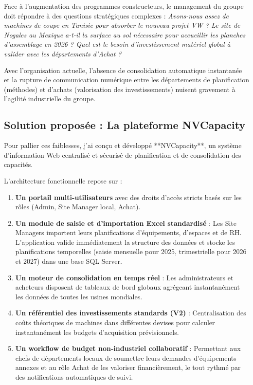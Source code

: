 Face à l'augmentation des programmes constructeurs, le management du groupe doit répondre à des questions stratégiques complexes : \textit{Avons-nous assez de machines de coupe en Tunisie pour absorber le nouveau projet VW ? Le site de Nogales au Mexique a-t-il la surface au sol nécessaire pour accueillir les planches d'assemblage en 2026 ? Quel est le besoin d'investissement matériel global à valider avec les départements d'Achat ?}

Avec l'organisation actuelle, l'absence de consolidation automatique instantanée et la rupture de communication numérique entre les départements de planification (méthodes) et d'achats (valorisation des investissements) nuisent gravement à l'agilité industrielle du groupe.

\subsection{Solution proposée : La plateforme NVCapacity}

Pour pallier ces faiblesses, j'ai conçu et développé **NVCapacity**, un système d'information Web centralisé et sécurisé de planification et de consolidation des capacités. 

L'architecture fonctionnelle repose sur :
\begin{enumerate}
    \item \textbf{Un portail multi-utilisateurs} avec des droits d'accès stricts basés sur les rôles (Admin, Site Manager local, Achat).
    \item \textbf{Un module de saisie et d'importation Excel standardisé} : Les Site Managers importent leurs planifications d'équipements, d'espaces et de RH. L'application valide immédiatement la structure des données et stocke les planifications temporelles (saisie mensuelle pour 2025, trimestrielle pour 2026 et 2027) dans une base SQL Server.
    \item \textbf{Un moteur de consolidation en temps réel} : Les administrateurs et acheteurs disposent de tableaux de bord globaux agrégeant instantanément les données de toutes les usines mondiales.
    \item \textbf{Un référentiel des investissements standards (V2)} : Centralisation des coûts théoriques de machines dans différentes devises pour calculer instantanément les budgets d'acquisition prévisionnels.
    \item \textbf{Un workflow de budget non-industriel collaboratif} : Permettant aux chefs de départements locaux de soumettre leurs demandes d'équipements annexes et au rôle Achat de les valoriser financièrement, le tout rythmé par des notifications automatiques de suivi.
\end{enumerate}

